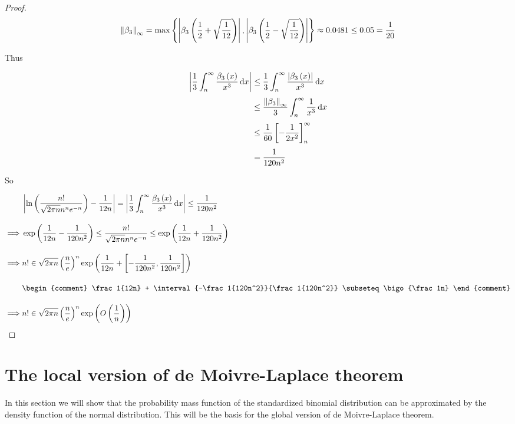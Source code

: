 \begin{proof}
  \begin{align}
    \snorm{\bps[3]} = \max\left\{\abs{\bp[3]{\frac 12 + \sqrt{\frac{1}{12}}}}, \abs{\bp[3]{\frac 12 - \sqrt{\frac{1}{12}}}}\right\} \approx 0.0481 \le 0.05 = \frac{1}{20}
  \end{align}

  \noindent Thus

  \begin{align}
    \abs{\frac 13\int_n^\infty \frac{\bp[3]{x}}{x^3} \d{x}} & \le \frac 13 \int_n^\infty \frac{\abs{\bp[3]{x}}}{x^3} \d{x} \nl
    & \le \frac{\snorm{\bps[3]}}{3} \int_n^\infty \frac 1{x^3} \d{x} \nl
    & \le \frac{1}{60} \left[-\frac{1}{2x^2}\right]_n^\infty \nl
    & = \frac 1{120n^2}
  \end{align}

  \noindent So

  \begin{align}
    & \abs{\ln\left(\frac{n!}{\sqrt{2\pi n}n^n e^{-n}}\right) - \frac 1{12n}} = \abs{\frac 13 \int_n^\infty \frac{\bp[3]{x}}{x^3} \d{x}} \le \frac{1}{120n^2} \bnl
    \implies & \fexp{\frac {1}{12n} - \frac 1{120n^2}}  \le \frac{n!}{\sqrt{2\pi n} n^n e^{-n}} \le \fexp{\frac 1{12n} + \frac 1{120n^2}} \bnl
    \implies & n! \in \sqrt{2\pi n} \left(\frac ne\right)^n \fexp{\frac 1{12n} + \interval{-\frac 1{120n^2}}{\frac 1{120n^2}}} \bnl
    &
    \begin{comment}
      \frac 1{12n} + \interval{-\frac 1{120n^2}}{\frac 1{120n^2}} \subseteq \bigo{\frac 1n}
    \end{comment} \bnl
    \implies & n! \in \sqrt{2\pi n} \left(\frac ne\right)^n \fexp{\bigo{\frac 1n}}
  \end{align}
\end{proof}

\section{The local version of de Moivre-Laplace theorem}

In this section we will show that the probability mass function of the standardized binomial distribution can be approximated by the density function of the normal distribution. This will be the basis for the global version of de Moivre-Laplace theorem.

\begin{theorem}
\end{theorem}


